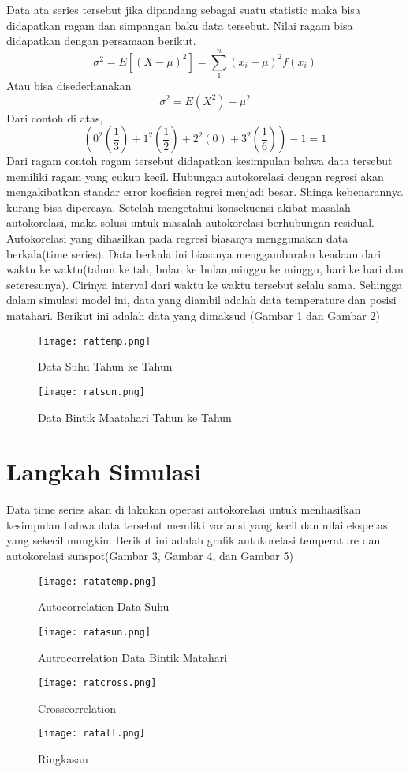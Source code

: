 \documentclass[conference]{IEEEtran}
\begin{document}
Data ata series tersebut jika dipandang sebagai suatu statistic maka bisa didapatkan ragam dan simpangan baku data tersebut. Nilai ragam bisa didapatkan dengan persamaan berikut.
$$\sigma^2=E\left[\left(X-\mu\right)^2\right]=\sum_{1}^{n}{\left(x_i-\mu\right)^2f\left(x_i\right)}$$
Atau bisa disederhanakan
$$\sigma^2=E\left(X^2\right)-\mu^2$$
Dari contoh di atas, 
$$\left(0^2\left(\frac{1}{3}\right)+1^2\left(\frac{1}{2}\right)+2^2\left(0\right)+3^2\left(\frac{1}{6}\right)\right)-1=1$$
Dari ragam contoh ragam tersebut didapatkan kesimpulan bahwa data tersebut memiliki ragam yang cukup kecil.
Hubungan autokorelasi dengan regresi akan mengakibatkan standar error koefisien regrei menjadi besar.  Shinga kebenarannya kurang bisa dipercaya.
Setelah mengetahui konsekuensi akibat masalah autokorelasi, maka solusi untuk masalah autokorelasi berhubungan residual. Autokorelasi yang dihasilkan pada regresi biasanya menggunakan data berkala(time series). Data berkala ini biasanya menggambarakn keadaan dari waktu ke waktu(tahun ke tah, bulan ke bulan,minggu ke minggu, hari ke hari dan seteresunya). Cirinya interval dari waktu ke waktu tersebut selalu sama. Sehingga dalam simulasi model ini, data yang diambil adalah data temperature dan posisi matahari. Berikut ini adalah data yang dimaksud (Gambar 1 dan Gambar 2)
\begin{figure}[h!]
	\centering
	\texttt{[image: rattemp.png]}
	\caption{Data Suhu Tahun ke Tahun}
\end{figure}
\begin{figure}[h]
	\centering
	\texttt{[image: ratsun.png]}
	\caption{Data Bintik Maatahari Tahun ke Tahun}
\end{figure}
\section{Langkah Simulasi}
Data time series akan di lakukan operasi autokorelasi untuk menhasilkan kesimpulan bahwa data tersebut memliki variansi yang kecil dan nilai ekspetasi yang sekecil mungkin. Berikut ini adalah grafik autokorelasi temperature dan autokorelasi sunspot(Gambar 3, Gambar 4, dan Gambar 5)
\begin{figure}[h]
	\centering
	\texttt{[image: ratatemp.png]}
	\caption{Autocorrelation Data Suhu}
\end{figure}
\begin{figure}[h]
	\centering
	\texttt{[image: ratasun.png]}
	\caption{Autrocorrelation Data Bintik Matahari}
\end{figure}
\begin{figure}[h]
	\centering
	\texttt{[image: ratcross.png]}
	\caption{Crosscorrelation}
\end{figure}
\begin{figure}
	\centering
	\texttt{[image: ratall.png]}
	\caption{Ringkasan}
\end{figure}
\end{document}
